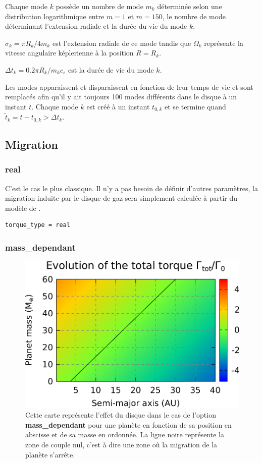 Chaque mode $k$ possède un nombre de mode $m_k$ déterminée selon une distribution logarithmique entre $m=1$ et $m=150$, le nombre de mode déterminant l'extension radiale et la durée du vie du mode $k$.

$\sigma_k = \pi R_k / 4m_k$ est l'extension radiale de ce mode tandis que $\Omega_k$ représente la vitesse angulaire képlerienne à la position $R=R_k$.

$\Delta t_k=0.2\pi R_k / m_k c_s$ est la durée de vie du mode $k$. 

\bigskip

Les modes apparaissent et disparaissent en fonction de leur temps de vie et sont remplacés afin qu'il y ait toujours 100 modes différents dans le disque à un instant $t$. Chaque mode $k$ est créé à un instant $t_{0,k}$ et se termine quand $\tilde{t}_k = t-t_{0,k} > \Delta t_k$.

\subsection{Migration}
\subsubsection{real}
C'est le cas le plus classique. Il n'y a pas besoin de définir d'autres paramètres, la migration induite par le disque de gaz sera simplement calculée à partir du modèle de \cite{paardekooper2011torque}.

\begin{verbatim}
torque_type = real
\end{verbatim}

\subsubsection{mass\_dependant}
\begin{figure}[htb]
\centering
\includegraphics[width=0.65\linewidth]{figure/migration_map/mass_dependant.pdf}
\caption{Cette carte représente l'effet du disque dans le cas de l'option \textbf{mass\_dependant} pour une planète en fonction de sa position en abscisse et de sa masse en ordonnée. La ligne noire représente la zone de couple nul, c'est à dire une zone où la migration de la planète s'arrête.}
\end{figure}


